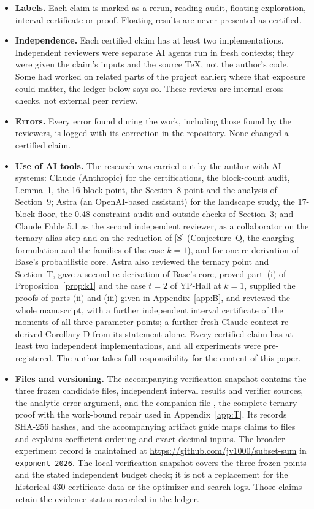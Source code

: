 \documentclass[11pt]{article}
\theoremstyle{plain}
\begin{document}
\begin{itemize}
\item \textbf{Labels.} Each claim is marked as a rerun, reading audit, floating exploration, interval certificate or proof. Floating results are never presented as certified.
\item \textbf{Independence.} Each certified claim has at least two implementations. Independent reviewers were separate AI agents run in fresh contexts; they were given the claim's inputs and the source \TeX, not the author's code. Some had worked on related parts of the project earlier; where that exposure could matter, the ledger below says so. These reviews are internal cross-checks, not external peer review.
\item \textbf{Errors.} Every error found during the work, including those found by the reviewers, is logged with its correction in the repository. None changed a certified claim.
\item \textbf{Use of AI tools.} The research was carried out by the author with AI systems: Claude (Anthropic) for the certifications, the block-count audit, Lemma~1, the 16-block point, the Section~8 point and the analysis of Section~9; Astra (an OpenAI-based assistant) for the landscape study, the 17-block floor, the 0.48 constraint audit and outside checks of Section~3; and Claude Fable 5.1 as the second independent reviewer, as a collaborator on the ternary alias step and on the reduction of [S] (Conjecture~Q, the charging formulation and the families of the case $k = 1$), and for one re-derivation of Base's probabilistic core. Astra also reviewed the ternary point and Section~T, gave a second re-derivation of Base's core, proved part~(i) of Proposition~\ref{prop:k1} and the case $t = 2$ of YP-Hall at $k = 1$, supplied the proofs of parts (ii) and (iii) given in Appendix~\ref{app:B}, and reviewed the whole manuscript, with a further independent interval certificate of the moments of all three parameter points; a further fresh Claude context re-derived Corollary D from its statement alone. Every certified claim has at least two independent implementations, and all experiments were pre-registered. The author takes full responsibility for the content of this paper.
\item \textbf{Files and versioning.} The accompanying verification snapshot contains the three frozen candidate files, independent interval results and verifier sources, the analytic error argument, and the companion file , the complete ternary proof with the work-bound repair used in Appendix~\ref{app:T}. Its  records SHA-256 hashes, and the accompanying artifact guide maps claims to files and explains coefficient ordering and exact-decimal inputs. The broader experiment record is maintained at \url{https://github.com/jv1000/subset-sum} in \texttt{exponent-2026}. The local verification snapshot covers the three frozen points and the stated independent budget check; it is not a replacement for the historical 430-certificate data or the optimizer and search logs. Those claims retain the evidence status recorded in the ledger.
\end{itemize}
\end{document}
